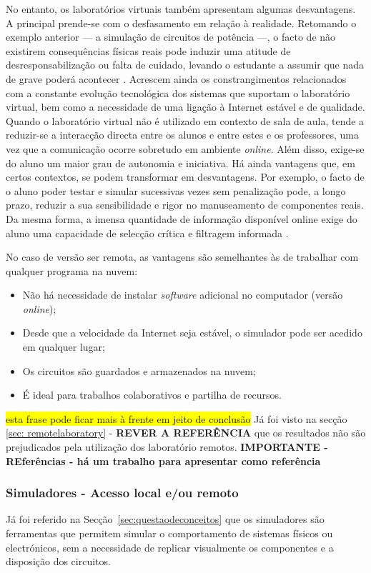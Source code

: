No entanto, os laboratórios virtuais também apresentam algumas desvantagens. A principal prende-se com o desfasamento em relação à realidade. Retomando o exemplo anterior — a simulação de circuitos de potência —, o facto de não existirem consequências físicas reais pode induzir uma atitude de desresponsabilização ou falta de cuidado, levando o estudante a assumir que nada de grave poderá acontecer \cite{POTKONJAK2016309}. Acrescem ainda os constrangimentos relacionados com a constante evolução tecnológica dos sistemas que suportam o laboratório virtual, bem como a necessidade de uma ligação à Internet estável e de qualidade. Quando o laboratório virtual não é utilizado em contexto de sala de aula, tende a reduzir-se a interacção directa entre os alunos e entre estes e os professores, uma vez que a comunicação ocorre sobretudo em ambiente \textit{online}. Além disso, exige-se do aluno um maior grau de autonomia e iniciativa. Há ainda vantagens que, em certos contextos, se podem transformar em desvantagens. Por exemplo, o facto de o aluno poder testar e simular sucessivas vezes sem penalização pode, a longo prazo, reduzir a sua sensibilidade e rigor no manuseamento de componentes reais. Da mesma forma, a imensa quantidade de informação disponível online exige do aluno uma capacidade de selecção crítica e filtragem informada \cite{POTKONJAK2016309, vabtegensVL, Gherasim, Ghergulescu2019Feb}.

No caso de versão ser remota, as vantagens são semelhantes às de trabalhar com qualquer programa na nuvem:
\begin{itemize}
    \item Não há necessidade de instalar \textit{software} adicional no computador (versão \textit{online});
    \item Desde que a velocidade da Internet seja estável, o simulador pode ser acedido em qualquer lugar;
    \item Os circuitos são guardados e armazenados na nuvem;
    \item É ideal para trabalhos colaborativos e partilha de recursos.
\end{itemize}

\colorbox{yellow}{esta frase pode ficar mais à frente em jeito de conclusão}
Já foi visto na secção \ref{sec: remotelaboratory} - \textbf{REVER A REFERÊNCIA} que os resultados não são prejudicados pela utilização dos \acrshort{laboratório remoto}s. \textbf{IMPORTANTE - REferências - há um trabalho para apresentar como referência}

\subsubsection{Simuladores - Acesso local e/ou remoto}
Já foi referido na Secção~\ref{sec:questaodeconceitos} que os simuladores são ferramentas que permitem simular o comportamento de sistemas físicos ou electrónicos, sem a necessidade de replicar visualmente os componentes e a disposição dos circuitos. 

